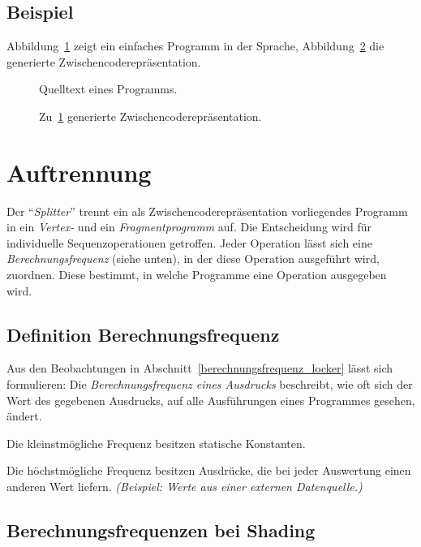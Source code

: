 \documentclass[twoside,a4paper,fleqn,12pt]{book}
\begin{document}
\subsection{Beispiel}

Abbildung~\ref{fig:ir_sample_src} zeigt ein einfaches Programm in der Sprache, Abbildung~\ref{fig:ir_sample_gen} die generierte Zwischencoderepräsentation.

\begin{figure}[h]
   \centering
  
  \caption{Quelltext eines Programms.}
  \label{fig:ir_sample_src}
\end{figure}
\begin{figure}[h]
   \centering
  
  \caption{Zu~\ref{fig:ir_sample_src} generierte Zwischencoderepräsentation.}
  \label{fig:ir_sample_gen}
\end{figure}

\section{Auftrennung}
\label{Auftrennung}

Der "`\emph{Splitter}"' trennt ein als Zwischencoderepräsentation vorliegendes Programm in ein \emph{Vertex-} und ein \emph{Fragmentprogramm} auf.
Die Entscheidung wird für individuelle Sequenzoperationen getroffen. Jeder Operation lässt sich eine \emph{Berechnungsfrequenz} (siehe unten),
in der diese Operation ausgeführt wird, zuordnen. Diese bestimmt, in welche Programme eine Operation ausgegeben wird.

\subsection{Definition Berechnungsfrequenz}
\label{Berechnungsfrequenz}

Aus den Beobachtungen in Abschnitt~\ref{berechnungsfrequenz_locker} lässt sich formulieren:
Die \emph{Berechnungsfrequenz eines Ausdrucks} beschreibt, wie oft sich der Wert des gegebenen Ausdrucks, auf alle Ausführungen eines
Programmes gesehen, ändert.

Die kleinstmögliche Frequenz besitzen statische Konstanten.

Die höchstmögliche Frequenz besitzen Ausdrücke, die bei jeder Auswertung einen anderen Wert liefern.
\emph{(Beispiel: Werte aus einer externen Datenquelle.)}

\subsection{Berechnungsfrequenzen bei Shading}
\end{document}
